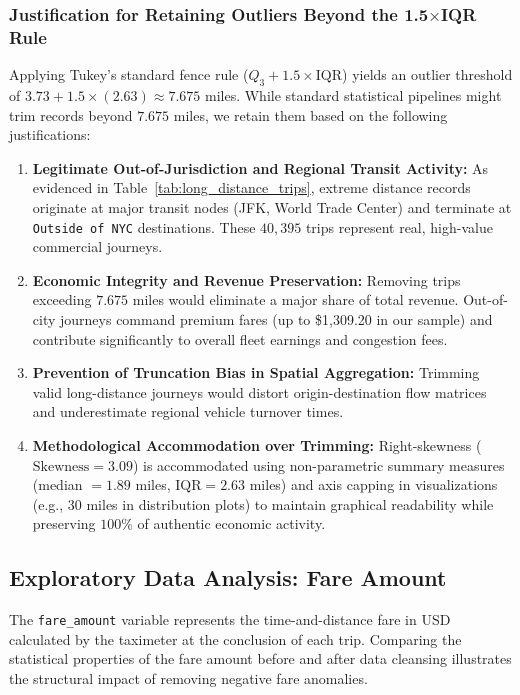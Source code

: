 \documentclass[11pt,a4paper]{article}
\begin{document}
\subsubsection{Justification for Retaining Outliers Beyond the 1.5$\times$IQR Rule}
Applying Tukey's standard fence rule ($Q_3 + 1.5 \times \text{IQR}$) yields an outlier threshold of $3.73 + 1.5 \times (2.63) \approx 7.675$ miles. While standard statistical pipelines might trim records beyond $7.675$ miles, we retain them based on the following justifications:
\begin{enumerate}
    \item \textbf{Legitimate Out-of-Jurisdiction and Regional Transit Activity:} As evidenced in Table~\ref{tab:long_distance_trips}, extreme distance records originate at major transit nodes (JFK, World Trade Center) and terminate at \texttt{Outside of NYC} destinations. These $40,395$ trips represent real, high-value commercial journeys.
    \item \textbf{Economic Integrity and Revenue Preservation:} Removing trips exceeding $7.675$ miles would eliminate a major share of total revenue. Out-of-city journeys command premium fares (up to \$1,309.20 in our sample) and contribute significantly to overall fleet earnings and congestion fees.
    \item \textbf{Prevention of Truncation Bias in Spatial Aggregation:} Trimming valid long-distance journeys would distort origin-destination flow matrices and underestimate regional vehicle turnover times.
    \item \textbf{Methodological Accommodation over Trimming:} Right-skewness ($\text{Skewness} = 3.09$) is accommodated using non-parametric summary measures (median $= 1.89$ miles, $\text{IQR} = 2.63$ miles) and axis capping in visualizations (e.g., $30$ miles in distribution plots) to maintain graphical readability while preserving $100\%$ of authentic economic activity.
\end{enumerate}

\subsection{Exploratory Data Analysis: Fare Amount}
\label{sec:eda_fare_amount}

The \texttt{fare\_amount} variable represents the time-and-distance fare in USD calculated by the taximeter at the conclusion of each trip. Comparing the statistical properties of the fare amount before and after data cleansing illustrates the structural impact of removing negative fare anomalies.
\end{document}
